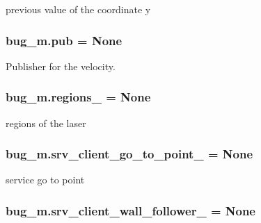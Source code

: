 previous value of the coordinate y 

\subsubsection[{\texorpdfstring{pub}{pub}}]{\setlength{\rightskip}{0pt plus 5cm}bug\+\_\+m.\+pub = None}\hypertarget{namespacebug__m_adc14150838edf40c8028207cd6bb2082}{}\label{namespacebug__m_adc14150838edf40c8028207cd6bb2082}


Publisher for the velocity. 

\subsubsection[{\texorpdfstring{regions\+\_\+}{regions_}}]{\setlength{\rightskip}{0pt plus 5cm}bug\+\_\+m.\+regions\+\_\+ = None}\hypertarget{namespacebug__m_ac9d4d95c034fca5a2b5d08ea845bbfcb}{}\label{namespacebug__m_ac9d4d95c034fca5a2b5d08ea845bbfcb}


regions of the laser 

\subsubsection[{\texorpdfstring{srv\+\_\+client\+\_\+go\+\_\+to\+\_\+point\+\_\+}{srv_client_go_to_point_}}]{\setlength{\rightskip}{0pt plus 5cm}bug\+\_\+m.\+srv\+\_\+client\+\_\+go\+\_\+to\+\_\+point\+\_\+ = None}\hypertarget{namespacebug__m_abd32bbd25b55f71e56505e72ba56c2f6}{}\label{namespacebug__m_abd32bbd25b55f71e56505e72ba56c2f6}


service go to point 

\subsubsection[{\texorpdfstring{srv\+\_\+client\+\_\+wall\+\_\+follower\+\_\+}{srv_client_wall_follower_}}]{\setlength{\rightskip}{0pt plus 5cm}bug\+\_\+m.\+srv\+\_\+client\+\_\+wall\+\_\+follower\+\_\+ = None}\hypertarget{namespacebug__m_af40e8063430e5b54ef2f3f8368338744}{}\label{namespacebug__m_af40e8063430e5b54ef2f3f8368338744}



